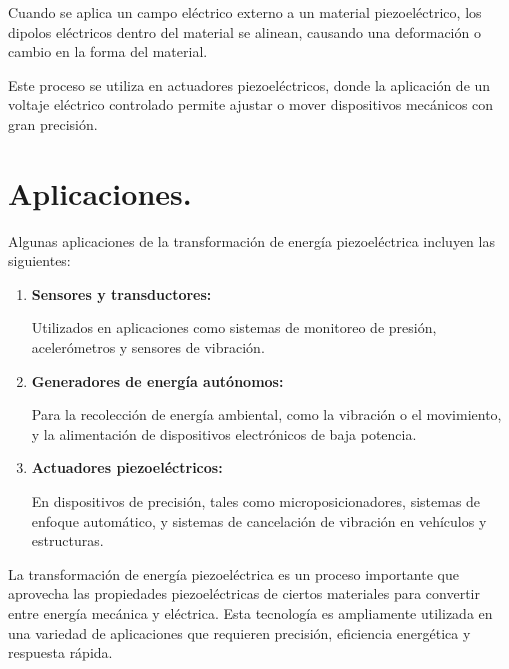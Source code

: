 \documentclass[12pt]{article}
\begin{document}
Cuando se aplica un campo eléctrico externo a un material piezoeléctrico, los dipolos eléctricos dentro del material se alinean, causando una deformación o cambio en la forma del material.

Este proceso se utiliza en actuadores piezoeléctricos, donde la aplicación de un voltaje eléctrico controlado permite ajustar o mover dispositivos mecánicos con gran precisión.

\section{Aplicaciones.}

Algunas aplicaciones de la transformación de energía piezoeléctrica incluyen las siguientes:

\begin{enumerate}
\item \textbf{Sensores y transductores:}

Utilizados en aplicaciones como sistemas de monitoreo de presión, acelerómetros y sensores de vibración.

\item \textbf{Generadores de energía autónomos:}

Para la recolección de energía ambiental, como la vibración o el movimiento, y la alimentación de dispositivos electrónicos de baja potencia.

\item \textbf{Actuadores piezoeléctricos:}

En dispositivos de precisión, tales como microposicionadores, sistemas de enfoque automático, y sistemas de cancelación de vibración en vehículos y estructuras.
\end{enumerate}

La transformación de energía piezoeléctrica es un proceso importante que aprovecha las propiedades piezoeléctricas de ciertos materiales para convertir entre energía mecánica y eléctrica. Esta tecnología es ampliamente utilizada en una variedad de aplicaciones que requieren precisión, eficiencia energética y respuesta rápida.
\end{document}
